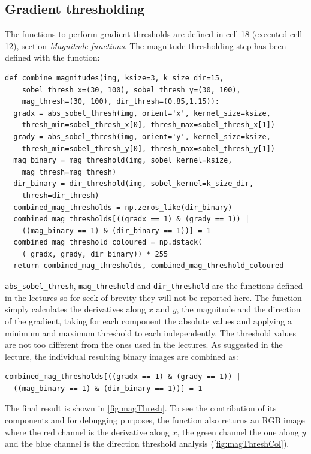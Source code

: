 \documentclass{article}
\let\cd\lstinline
\begin{document}
\subsection{Gradient thresholding}
The functions to perform gradient thresholds are defined in cell 18 (executed cell 12), section \textit{Magnitude functions}. The magnitude thresholding step has been defined with the function:
\begin{lstlisting}
def combine_magnitudes(img, ksize=3, k_size_dir=15, 
    sobel_thresh_x=(30, 100), sobel_thresh_y=(30, 100), 
    mag_thresh=(30, 100), dir_thresh=(0.85,1.15)):
  gradx = abs_sobel_thresh(img, orient='x', kernel_size=ksize, 
    thresh_min=sobel_thresh_x[0], thresh_max=sobel_thresh_x[1])
  grady = abs_sobel_thresh(img, orient='y', kernel_size=ksize, 
    thresh_min=sobel_thresh_y[0], thresh_max=sobel_thresh_y[1])
  mag_binary = mag_threshold(img, sobel_kernel=ksize, 
    mag_thresh=mag_thresh)
  dir_binary = dir_threshold(img, sobel_kernel=k_size_dir, 
    thresh=dir_thresh)
  combined_mag_thresholds = np.zeros_like(dir_binary)
  combined_mag_thresholds[((gradx == 1) & (grady == 1)) | 
    ((mag_binary == 1) & (dir_binary == 1))] = 1
  combined_mag_threshold_coloured = np.dstack(
    ( gradx, grady, dir_binary)) * 255
  return combined_mag_thresholds, combined_mag_threshold_coloured
\end{lstlisting}
\cd+abs_sobel_thresh+, \cd+mag_threshold+ and \cd+dir_threshold+ are the functions defined in the lectures so for seek of brevity they will not be reported here. The function simply calculates the derivatives along $x$ and $y$, the magnitude and the direction of  the gradient, taking for each component the absolute values and applying a minimum and maximum threshold to each independently. The threshold values are not too different from the ones used in the lectures. As suggested in the lecture, the individual resulting binary images are combined as:
\begin{lstlisting}
combined_mag_thresholds[((gradx == 1) & (grady == 1)) | 
  ((mag_binary == 1) & (dir_binary == 1))] = 1
\end{lstlisting}
The final result is shown in \autoref{fig:magThresh}. To see the contribution of its components and for debugging purposes, the function also returns an RGB image where the red channel is the derivative along $x$, the green channel the one along $y$ and the blue channel is the direction threshold analysis (\autoref{fig:magThreshCol}).
\end{document}
